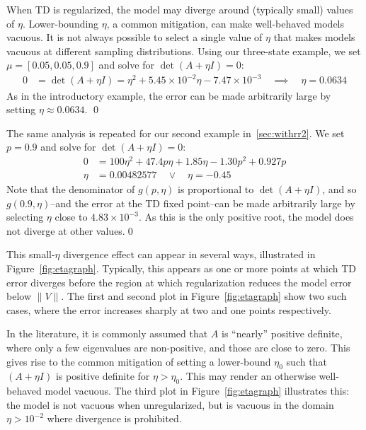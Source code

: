 \begin{example}\label{ex:badeta}
	When TD is regularized, the model may diverge around (typically small) values of $\eta$. Lower-bounding $\eta$, a common mitigation, can make well-behaved models vacuous. It is not always possible to select a single value of $\eta$ that makes models vacuous at different sampling distributions.
	\vspace{-1em}\proof
	Using our three-state example, we set $\mu=[0.05, 0.05, 0.9]$ and solve for $\det(A+\eta I)=0$:
	\begin{align}
		0 & = \det(A+\eta I) = \eta^2 + 5.45\times 10^{-2} \eta - 7.47\times 10^{-3}
		\quad\implies\quad  \eta = 0.0634
	\end{align}
	As in the introductory example, the error can be made arbitrarily large by setting $\eta\approx 0.0634$.
	\qed{}
\end{example}


The same analysis is repeated for our second example in~\ref{sec:withrr2}. We set $p=0.9$ and solve for $\det(A+\eta I)=0$:
\proof{}
\begin{align}
	0 & = 100\eta^2+47.4p\eta +1.85\eta - 1.30p^2 + 0.927p
	\\  \eta & = 0.00482577 \quad \lor \quad \eta = -0.45
\end{align}
Note that the denominator of $g(p,\eta)$ is proportional to $\det(A+\eta I)$, and so $g(0.9,\eta)$--and the error at the TD fixed point--can be made arbitrarily large by selecting $\eta$ close to $4.83\times 10^{-3}$. As this is the only positive root, the model does not diverge at other values.\qed{}

This small-$\eta$ divergence effect can appear in several ways, illustrated in Figure~\ref{fig:etagraph}. Typically, this appears as one or more points at which TD error diverges before the region at which regularization reduces the model error below $\|V\|$. The first and second plot in Figure~\ref{fig:etagraph} show two such cases, where the error increases sharply at two and one points respectively.

In the literature, it is commonly assumed that $A$ is ``nearly'' positive definite, where only a few eigenvalues are non-positive, and those are close to zero. This gives rise to the common mitigation of setting a lower-bound $\eta_0$ such that $(A+\eta I)$ is positive definite for $\eta>\eta_0$. This may render an otherwise well-behaved model vacuous. The third plot in Figure~\ref{fig:etagraph} illustrates this: the model is not vacuous when unregularized, but is vacuous in the domain $\eta > 10^{-2}$ where divergence is prohibited.

